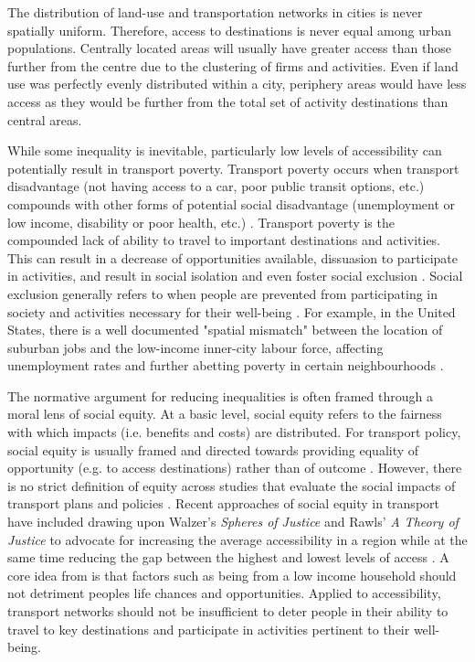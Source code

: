 \documentclass[11 pt, letterpaper]{article}
\begin{document}
{The distribution of land-use and transportation networks in cities is never spatially uniform. Therefore, access to destinations is never equal among urban populations. Centrally located areas will usually have greater access than those further from the centre due to the clustering of firms and activities. Even if land use was perfectly evenly distributed within a city, periphery areas would have less access as they would be further from the total set of activity destinations than central areas.

While some inequality is inevitable, particularly low levels of accessibility can potentially result in transport poverty. Transport poverty occurs when transport disadvantage (not having access to a car, poor public transit options, etc.) compounds with other forms of potential social disadvantage (unemployment or low income, disability or poor health, etc.) \cite{lucas2012}. Transport poverty is the compounded lack of ability to travel to important destinations and activities. This can result in a decrease of opportunities available, dissuasion to participate in activities, and result in social isolation and even foster social exclusion \cite{garrett1999,casas2007,preston2007,lucas2012}. Social exclusion generally refers to when people are prevented from participating in society and activities necessary for their well-being \cite{litman2003,levitas2007}. For example, in the United States, there is a well documented "spatial mismatch" between the location of suburban jobs and the low-income inner-city labour force, affecting unemployment rates and further abetting poverty in certain neighbourhoods \cite{holzer1991}.

The normative argument for reducing inequalities is often framed through a moral lens of social equity. At a basic level, social equity refers to the fairness with which impacts (i.e. benefits and costs) are distributed. For transport policy, social equity is usually framed and directed towards providing equality of opportunity (e.g. to access destinations) rather than of outcome \cite{litman2003}. However, there is no strict definition of equity across studies that evaluate the social impacts of transport plans and policies \cite{preston2007,martens2012justice,pereira2017}. Recent approaches of social equity in transport have included drawing upon Walzer's \textit{Spheres of Justice} \cite{waltzer1983} and Rawls' \textit{A Theory of Justice} \cite{rawls1971} to advocate for increasing the average accessibility in a region while at the same time reducing the gap between the highest and lowest levels of access \cite{martens2012justice,martens2016,pereira2017}. A core idea from  is that factors such as being from a low income household should not detriment peoples life chances and opportunities. Applied to accessibility, transport networks should not be insufficient to deter people in their ability to travel to key destinations and participate in activities pertinent to their well-being.

}
\end{document}
